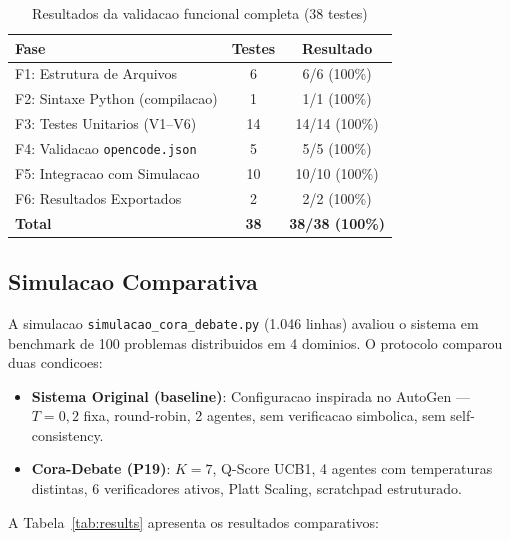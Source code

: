 \documentclass[5p]{elsarticle}
\begin{document}
\begin{table}[H]
  \centering
  \caption{Resultados da validacao funcional completa (38 testes)}
  \label{tab:validation}
  \begin{tabular}{lcc}
    \toprule
    \textbf{Fase} & \textbf{Testes} & \textbf{Resultado} \\
    \midrule
    F1: Estrutura de Arquivos & 6 & 6/6 (100\%) \\
    F2: Sintaxe Python (compilacao) & 1 & 1/1 (100\%) \\
    F3: Testes Unitarios (V1--V6) & 14 & 14/14 (100\%) \\
    F4: Validacao \texttt{opencode.json} & 5 & 5/5 (100\%) \\
    F5: Integracao com Simulacao & 10 & 10/10 (100\%) \\
    F6: Resultados Exportados & 2 & 2/2 (100\%) \\
    \midrule
    \textbf{Total} & \textbf{38} & \textbf{38/38 (100\%)} \\
    \bottomrule
  \end{tabular}
\end{table}

\subsection{Simulacao Comparativa}

A simulacao \texttt{simulacao\_cora\_debate.py} (1.046 linhas) avaliou o sistema em benchmark de 100 problemas distribuidos em 4 dominios. O protocolo comparou duas condicoes:

\begin{itemize}
  \item \textbf{Sistema Original (baseline)}: Configuracao inspirada no AutoGen \cite{wu2023} --- $T = 0,2$ fixa, round-robin, 2 agentes, sem verificacao simbolica, sem self-consistency.
  \item \textbf{Cora-Debate (P19)}: $K=7$, Q-Score UCB1, 4 agentes com temperaturas distintas, 6 verificadores ativos, Platt Scaling, scratchpad estruturado.
\end{itemize}

A Tabela~\ref{tab:results} apresenta os resultados comparativos:
\end{document}
